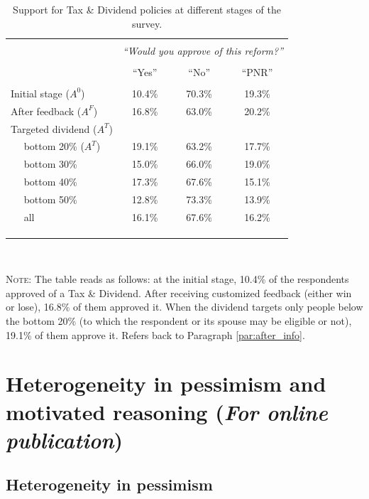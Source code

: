 \documentclass[12pt]{article} %
\begin{document}
\begin{appendices}
\begin{table}[!htbp] \centering 
 \caption{Support for Tax \& Dividend policies at different stages of the survey.}
 \label{tab:approval_td} 
\begin{tabular}{@{\extracolsep{5pt}}lccc} 
\\[-1.2ex]\hline 
\hline \\[-1.2ex] 
& \multicolumn{3}{c}{\textit{``Would you approve of this reform?''}} \\ 
\cline{2-4} 
\\[-1.2ex] & ``Yes'' & ``No'' & ``PNR'' \\ \hline \\[-1.8ex] 
Initial stage ($A^0$) & 10.4\% & 70.3\% & 19.3\% \\
After feedback ($A^F$) & 16.8\% & 63.0\% & 20.2\% \\
Targeted dividend ($A^T$) &  &  &  \\
$\quad$ bottom 20\% ($A^{T}$) & 19.1\% & 63.2\% & 17.7\% \\
$\quad$ bottom 30\% & 15.0\% & 66.0\% & 19.0\% \\
$\quad$ bottom 40\% & 17.3\% & 67.6\% & 15.1\% \\
$\quad$ bottom 50\% & 12.8\% & 73.3\% & 13.9\% \\
$\quad$ all & 16.1\% & 67.6\% & 16.2\% \\ \\
  [-1.2ex] \hline \\[-1.6ex]
\hline \\[-0.8ex]
\end{tabular}
{
\\
\footnotesize \parbox[t]{12.5cm}{\linespread{1.2}\selectfont \textsc{Note:} The table reads as follows: at the initial stage, 10.4\% of the respondents approved of a Tax \& Dividend. After receiving customized feedback (either win or lose), 16.8\% of them approved it. When the dividend targets only people below the bottom 20\% (to which the respondent or its spouse may be eligible or not), 19.1\% of them approve it. Refers back to Paragraph \ref{par:after_info}.}}
\end{table}

\section{Heterogeneity in pessimism and motivated reasoning (\emph{For online publication})\label{app_heterogeneity}}

\subsection{Heterogeneity in pessimism\label{sec:heterogeneity_update}}


\end{appendices}
\end{document}
